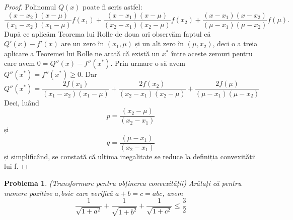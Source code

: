 \documentclass[a4paper,12pt,oneside]{report}
\newtheorem{problem}{Problema}
\begin{document}
\begin{proof}
Polinomul \(Q\left ( x \right )\) poate fi scris astfel:
\begin{displaymath}
  \frac{\left ( x - x_{2} \right )\left ( x - \mu  \right )}{\left ( x_{1}  - x_{2}\right )\left ( x_{1} - \mu  \right )} f\left ( x_{1} \right ) + \frac{\left ( x - x_{1} \right )\left ( x - \mu  \right )}{\left ( x_{2}  - x_{1}\right )\left ( x_{2} - \mu  \right )}  f\left ( x_{2} \right ) +  \frac{\left ( x - x_{1} \right )\left ( x - x_{2}  \right )}{\left ( \mu   - x_{1}\right )\left (  \mu - x_{2} \right )}f\left ( \mu \right ).
\end{displaymath}
După ce aplicăm Teorema lui Rolle de doua ori observăm faptul că  \({Q}'\left ( x \right ) - {f}'\left ( x \right )\) are un zero în \(\left ( x_{1} , \mu \right )\) și un alt zero în \(\left ( \mu  , x_{2} \right )\), deci o a treia aplicare a Teoremei lui Rolle ne arată că există un \(x^{*}\) între aceste zerouri pentru care avem \(0 = {Q}''\left ( x \right ) - {f}''\left ( x^{*} \right )\). Prin urmare o să avem \({Q}''\left ( x^{*}  \right ) = {f}''\left ( x^{*} \right )\geq 0\). Dar
\begin{displaymath}
  {Q}''\left ( x^{*}  \right ) = \frac{2f\left ( x_{1} \right )}{\left ( x_{1} - x_{2} \right )\left ( x_{1} - \mu  \right )} +  \frac{2f\left ( x_{2} \right )}{\left ( x_{2} - x_{1} \right )\left ( x_{2} - \mu  \right )} +  \frac{2f\left (\mu  \right )}{\left ( \mu  - x_{1} \right )\left ( \mu  - x_{2} \right )}
\end{displaymath}
Deci, luând
\begin{displaymath}
  p = \frac{\left ( x_{2} - \mu  \right )}{\left ( x_{2} - x_{1}\right )}
\end{displaymath}
și
\begin{displaymath}
  q = \frac{\left ( \mu  - x_{1} \right )}{\left ( x_{2} - x_{1} \right )}
\end{displaymath}
și simplificând, se constată că ultima inegalitate se reduce la definiția convexității lui f.
\end{proof}
\begin{problem} (Transformare pentru obținerea convexității)
Arătați că pentru numere pozitive \(a , b si c\) care verifică \(a + b = c = abc\), avem
\begin{displaymath}
  \frac{1}{\sqrt{1 + a^{2}}} + \frac{1}{\sqrt{1 + b^{2}}} + \frac{1}{\sqrt{1 + c^{2}}} \leq \frac{3}{2}
\end{displaymath}
\end{problem}
\end{document}
